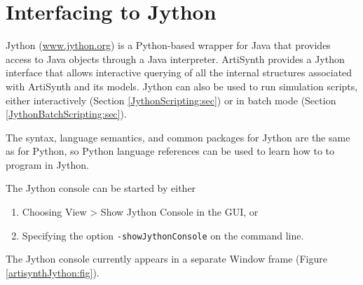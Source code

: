 \documentclass{article}
\begin{document}
\section{Interfacing to Jython}
\label{JythonInterface:sec}

Jython (\href{http://www.jython.org}{www.jython.org})
is a Python-based wrapper for
Java that provides access to Java objects through a Java interpreter.
ArtiSynth provides a Jython interface that allows interactive querying
of all the internal structures associated with ArtiSynth and its
models. Jython can also be used to run simulation scripts, either
interactively (Section \ref{JythonScripting:sec}) or in batch mode
(Section \ref{JythonBatchScripting:sec}).

The syntax, language semantics, and common packages for Jython are
the same as for Python, so Python language references can be used to
learn how to to program in Jython.

The Jython console can be started by either

\begin{enumerate}

\item Choosing {\sf View > Show Jython Console} in the GUI, or

\item Specifying the option {\tt -showJythonConsole} on
the command line.

\end{enumerate}

The Jython console currently appears in a separate Window frame
(Figure \ref{artisynthJython:fig}).
\end{document}
